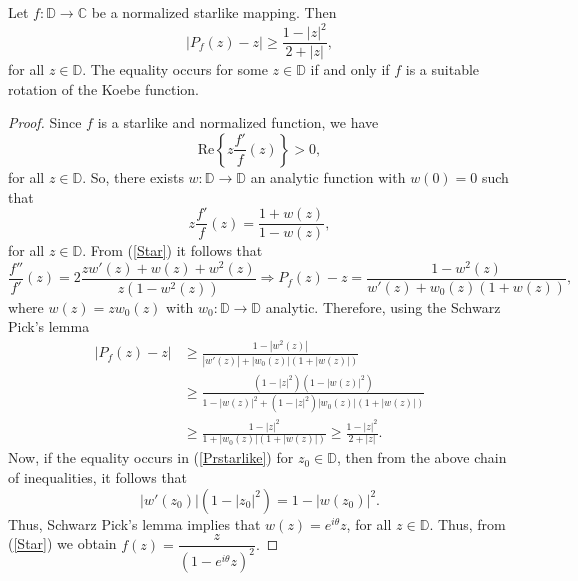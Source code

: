 \documentclass[10pt,a4paper]{amsart}
\newcommand{\C}{\mathbb{C}}
\newcommand{\D}{\mathbb{D}}
\begin{document}
\begin{prop}\label{Starlike}
 Let $f:\D\to\C$ be a normalized starlike mapping. Then 
 \begin{equation}\label{Prstarlike}
  |P_f(z)-z|\geq \dfrac{1-|z|^2}{2+|z|},   
 \end{equation}
 for all $z\in\D.$ The equality occurs for some $z\in\D$ if and only if $f$ is a suitable rotation of the Koebe function.    
\end{prop}

\begin{proof}
 Since $f$ is a starlike and normalized function, we have
\begin{equation*}
\text{Re} \left\{z\frac{f'}{f}(z)\right\}>0,
\end{equation*}
for all $z\in \D$. So, there exists $w:\D \to \D$ an analytic function with $w(0)=0$ such that 
\begin{equation} \label{Star}
z\frac{f'}{f}(z)=\frac{1+w(z)}{1-w(z)},
\end{equation}
for all $z\in \D$. From (\ref{Star}) it follows that
\begin{equation*}
  \frac{f''}{f'}(z)=2\frac{zw'(z)+w(z)+w^2(z)}{z(1-w^2(z))} \Rightarrow P_f(z)-z=\frac{1-w^2(z)}{w'(z)+w_0(z)(1+w(z))},
\end{equation*}
where $w(z)=zw_0(z)$ with $w_0:\D \to \D$ analytic. Therefore, using the Schwarz Pick's lemma
\begin{align*}
    |P_f(z)-z|&\geq \frac{1-|w^2(z)|}{|w'(z)|+|w_0(z)|(1+|w(z)|)}\\
    &\geq\frac{(1-|z|^2)(1-|w(z)|^2)}{1-|w(z)|^2 +(1-|z|^2)|w_0(z)|(1+|w(z)|)}\\
    &\geq \frac{1-|z|^2}{1+|w_0(z)|(1+|w(z)|)}\geq \frac{1-|z|^2}{2+|z|}.
\end{align*}
Now, if the equality occurs in (\ref{Prstarlike}) for $z_0 \in \D$, then from the above chain of inequalities, it follows that
\[|w'(z_0)|(1-|z_0|^2)=1-|w(z_0)|^2.\]
Thus, Schwarz Pick's lemma implies that $w(z)=e^{i\theta}z$, for all $z\in \D$. Thus, from (\ref{Star}) we obtain $f(z)=\dfrac{z}{(1-e^{i\theta}z)^2}.$ 
\end{proof}
\end{document}
